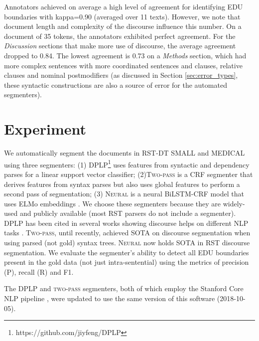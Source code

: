 \medskip
{} Annotators achieved on average a high level of agreement for identifying EDU boundaries with kappa=0.90 (averaged over 11 texts). However, we note that document length and complexity of the discourse influence this number. On a document of 35 tokens, the annotators exhibited perfect agreement. For the \textit{Discussion} sections that make more use of discourse, the average agreement dropped to 0.84. The lowest agreement is 0.73 on a \textit{Methods} section, which had more complex sentences with more coordinated sentences and clauses, relative clauses and nominal postmodifiers (as discussed in Section \ref{sec:error_types}, these syntactic constructions are also a source of error for the automated segmenters).

\section{Experiment}
We automatically segment the documents in \textsc{RST-DT SMALL} and \textsc{MEDICAL} using three segmenters: (1) \textsc{DPLP}\footnote{https://github.com/jiyfeng/DPLP} uses features from syntactic and dependency parses for a linear support vector classifier; (2)\textsc{Two-pass} \cite{Feng:2014} is a CRF segmenter that derives features from syntax parses but also uses global features to perform a second pass of segmentation; (3) \textsc{Neural} \cite{Wang:2018} is a neural BiLSTM-CRF model that uses ELMo embeddings \cite{Peters:2018}. We choose these segmenters because they are widely-used and publicly available (most RST parsers do not include a segmenter). \textsc{DPLP} has been cited in several works showing discourse helps on different NLP tasks \cite{Bhatia:2015}. \textsc{Two-pass}, until recently, achieved SOTA on discourse segmentation when using parsed (not gold) syntax trees. \textsc{Neural} now holds SOTA in RST discourse segmentation. We evaluate the segmenter's ability to detect all EDU boundaries present in the gold data (not just intra-sentential) using the metrics of precision (P), recall (R) and F1.

The \textsc{DPLP} and \textsc{two-pass} segmenters, both of which employ the Stanford Core NLP pipeline \cite{Manning:2014}, were updated to use the same version of this software (2018-10-05).


